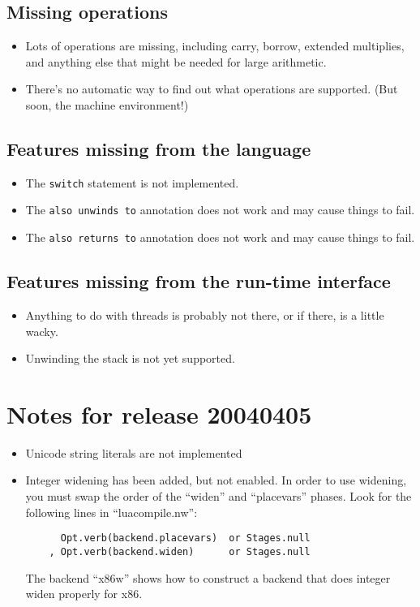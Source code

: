 \documentclass{article}
\begin{document}
\subsection{Missing operations}

\begin{itemize}
\item
Lots of operations are missing, including
carry, borrow, extended multiplies, and anything else that might be
needed for large arithmetic.
\item
There's no automatic way to find out what operations are supported.
(But soon, the machine environment!)
\end{itemize}

\subsection{Features missing from the language}

\begin{itemize}
\item
The \texttt{switch} statement is not implemented.
\item
The \texttt{also unwinds to} annotation does not work and may cause
things to fail.
\item
The \texttt{also returns to} annotation does not work and may cause
things to fail.
\end{itemize}


\subsection{Features missing from the run-time interface}
\begin{itemize}
\item
Anything to do with threads is probably not there, or if there, is a
little wacky.
\item
Unwinding the stack is not yet supported.
\end{itemize}


\section{Notes for release 20040405}
\begin{itemize}
\item
Unicode string literals are not implemented

\item Integer widening has been added, but not enabled.
In order to use widening, you must swap the order of the
``widen'' and ``placevars'' phases.  Look for the following lines in
``luacompile.nw'':
\begin{verbatim}
      Opt.verb(backend.placevars)  or Stages.null
    , Opt.verb(backend.widen)      or Stages.null
\end{verbatim}
The backend ``x86w'' shows how to construct a backend that does
integer widen properly for x86.

\end{itemize}
\end{document}

